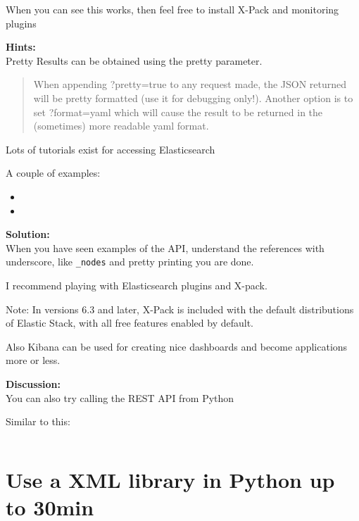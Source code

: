 \documentclass[a4paper,11pt,notitlepage]{report}
\begin{document}
When you can see this works, then feel free to install X-Pack and monitoring plugins

{\bf Hints:}\\
Pretty Results can be obtained using the pretty parameter.
\begin{quote}
When appending ?pretty=true to any request made, the JSON returned will be pretty formatted (use it for debugging only!). Another option is to set ?format=yaml which will cause the result to be returned in the (sometimes) more readable yaml format.
\end{quote}

Lots of tutorials exist for accessing Elasticsearch

A couple of examples:
\begin{itemize}
\item {}
\item {}
\end{itemize}

{\bf Solution:}\\
When you have seen examples of the API, understand the references with underscore, like \verb+_nodes+ and pretty printing you are done.

I recommend playing with Elasticsearch plugins and X-pack.\\

Note: In versions 6.3 and later, X-Pack is included with the default distributions of Elastic Stack, with all free features enabled by default.

Also Kibana can be used for creating nice dashboards and become applications more or less.

{\bf Discussion:}\\
You can also try calling the REST API from Python

Similar to this:
\inputminted{python}{programs/rest-1.py}








\chapter{Use a XML library in Python up to 30min}
\label{ex-python-library}
\end{document}
